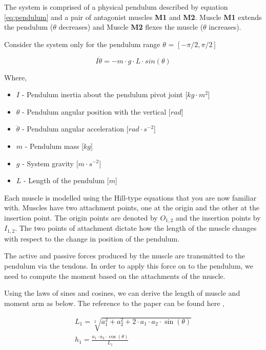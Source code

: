 \documentclass{cmc}
\begin{document}
The system is comprised of a physical pendulum described by equation \ref{eq:pendulum} and a pair of antagonist muscles \textbf{M1} and \textbf{M2}. Muscle \textbf{M1} extends the pendulum ($\theta$ decreases) and Muscle \textbf{M2} flexes the muscle ($\theta$ increases).

Consider the system only for the pendulum range $\theta$ =
$[-\pi/2, \pi/2]$

\begin{equation}
  \label{eq:pendulum}
  I\ddot{\theta} = - m \cdot g \cdot L \cdot sin(\theta)
\end{equation}

Where,

\begin{itemize}
\item $I$ - Pendulum inertia about the pendulum pivot joint
  [$kg \cdot m^2$]
\item $\theta$ - Pendulum angular position with the vertical [$rad$]
\item $\ddot{\theta}$ - Pendulum angular acceleration
  [$rad \cdot s^{-2}$]
\item $m$ - Pendulum mass [$kg$]
\item $g$ - System gravity [$m \cdot s^{-2}$]
\item $L$ - Length of the pendulum [$m$]
\end{itemize}

Each muscle is modelled using the Hill-type equations that you are now
familiar with.  Muscles have two attachment points, one at the origin
and the other at the insertion point.  The origin points are denoted
by $O_{1,2}$ and the insertion points by $I_{1,2}$. The two points of
attachment dictate how the length of the muscle changes with respect
to the change in position of the pendulum.

The active and passive forces produced by the muscle are transmitted
to the pendulum via the tendons. In order to apply this force on to
the pendulum, we need to compute the moment based on the attachments
of the muscle.

Using the laws of sines and cosines, we can derive the length of
muscle and moment arm as below. The reference to the paper can be found here
\href{https://www.ncbi.nlm.nih.gov/pmc/articles/PMC5323435}{},

\begin{eqnarray}
  \label{eq:2}
  L_1 = \sqrt[2]{a_{1}^2 + a_{2}^2 + 2 \cdot a_1 \cdot a_2 \cdot \sin(\theta)} \\
  h_1 = \frac{a_1 \cdot a_2 \cdot \cos(\theta)}{L_1}
\end{eqnarray}
\end{document}
